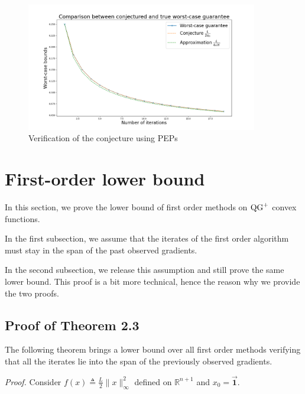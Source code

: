         \begin{figure}[h!]
            \centering
            \includegraphics[width=0.9\textwidth]{Figure_1.png}
            \caption{Verification of the conjecture using PEPs}
            \label{fig:gd_sqrt}
        \end{figure}

\section{First-order lower bound}
\label{apx:lower_bound}

    In this section, we prove the lower bound of first order methods on $\operatorname{QG}^+$ convex functions.
    
    In the first subsection, we assume that the iterates of the first order algorithm must stay in the span of the past observed gradients.
    
    In the second subsection, we release this assumption and still prove the same lower bound.
    This proof is a bit more technical, hence the reason why we provide the two proofs.
    
    \subsection{\texorpdfstring{Proof of Theorem 2.3}{Proof of Theorem~\ref{thm:general_lower_bound}}}
    \label{apx:lower_bound_1}

        The following theorem brings a lower bound over all first order methods verifying that all the iterates lie into the span of the previously observed gradients.
        
        \lowerboundoffirstorderalgorithm*
        
        \noindent \textit{Proof.}
            Consider $f(x) \triangleq \frac{L}{2}\|x\|_\infty^2$ defined on $\mathbb{R}^{n+1}$ and $x_0=\Vec{\mathbf{1}}$.
            
